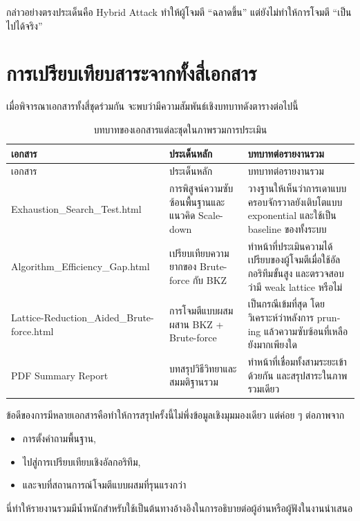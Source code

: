 \documentclass[12pt,a4paper]{article}
\newcommand{\eng}[1]{\textenglish{#1}}
\begin{document}
	กล่าวอย่างตรงประเด็นคือ \eng{Hybrid Attack} ทำให้ผู้โจมตี ``ฉลาดขึ้น'' แต่ยังไม่ทำให้การโจมตี ``เป็นไปได้จริง''
	
	\section{การเปรียบเทียบสาระจากทั้งสี่เอกสาร}
	
	เมื่อพิจารณาเอกสารทั้งสี่ชุดร่วมกัน จะพบว่ามีความสัมพันธ์เชิงบทบาทดังตารางต่อไปนี้
	
	\begin{longtable}{p{} p{} p{}}
		\caption{บทบาทของเอกสารแต่ละชุดในภาพรวมการประเมิน}\\
		\toprule
		เอกสาร & ประเด็นหลัก & บทบาทต่อรายงานรวม \\
		\midrule
		\endfirsthead
		\toprule
		เอกสาร & ประเด็นหลัก & บทบาทต่อรายงานรวม \\
		\midrule
		\endhead
		\eng{Exhaustion\_Search\_Test.html} & การพิสูจน์ความซับซ้อนพื้นฐานและแนวคิด \eng{Scale-down} & วางฐานให้เห็นว่าการเดาแบบครอบจักรวาลยังเติบโตแบบ \eng{exponential} และใช้เป็น \eng{baseline} ของทั้งระบบ \\
		\eng{Algorithm\_Efficiency\_Gap.html} & เปรียบเทียบความยากของ \eng{Brute-force} กับ \eng{BKZ} & ทำหน้าที่ประเมินความได้เปรียบของผู้โจมตีเมื่อใช้อัลกอริทึมขั้นสูง และตรวจสอบว่ามี \eng{weak lattice} หรือไม่ \\
		\eng{Lattice-Reduction\_Aided\_Brute-force.html} & การโจมตีแบบผสมผสาน \eng{BKZ + Brute-force} & เป็นกรณีเข้มที่สุด โดยวิเคราะห์ว่าหลังการ \eng{pruning} แล้วความซับซ้อนที่เหลือยังมากเพียงใด \\
		\eng{PDF Summary Report} & บทสรุปวิธีวิทยาและสมมติฐานรวม & ทำหน้าที่เชื่อมทั้งสามระยะเข้าด้วยกัน และสรุปสาระในภาพรวมเดียว \\
		\bottomrule
	\end{longtable}
	
	ข้อดีของการมีหลายเอกสารคือทำให้การสรุปครั้งนี้ไม่พึ่งข้อมูลเชิงมุมมองเดียว แต่ค่อย ๆ ต่อภาพจาก
	\begin{itemize}
		\item การตั้งคำถามพื้นฐาน,
		\item ไปสู่การเปรียบเทียบเชิงอัลกอริทึม,
		\item และจบที่สถานการณ์โจมตีแบบผสมที่รุนแรงกว่า
	\end{itemize}
	
	นี่ทำให้รายงานรวมมีน้ำหนักสำหรับใช้เป็นต้นทางอ้างอิงในการอธิบายต่อผู้อ่านหรือผู้ฟังในงานนำเสนอ
	
\end{document}
